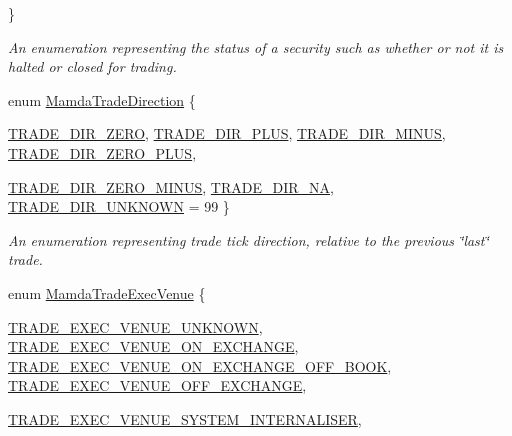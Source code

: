 \begin{CompactItemize}
 \}
\begin{CompactList}\small\item\em An enumeration representing the status of a security such as whether or not it is halted or closed for trading. \item\end{CompactList}\item 
enum \hyperlink{namespaceWombat_d2479765bb418204c8ccfd3785d2bdbe}{Mamda\-Trade\-Direction} \{ \par
\hyperlink{namespaceWombat_d2479765bb418204c8ccfd3785d2bdbe4972b420933103bdc7b20dd3f3cdd7a3}{TRADE\_\-DIR\_\-ZERO}, 
\hyperlink{namespaceWombat_d2479765bb418204c8ccfd3785d2bdbe80d6b3d5e922c65539c9a3eb99279a22}{TRADE\_\-DIR\_\-PLUS}, 
\hyperlink{namespaceWombat_d2479765bb418204c8ccfd3785d2bdbeb0517280f1434647d71e66ee732e30b5}{TRADE\_\-DIR\_\-MINUS}, 
\hyperlink{namespaceWombat_d2479765bb418204c8ccfd3785d2bdbeca1b1edf7fd88e7963866dddb80fa360}{TRADE\_\-DIR\_\-ZERO\_\-PLUS}, 
\par
\hyperlink{namespaceWombat_d2479765bb418204c8ccfd3785d2bdbead5395221de07c8d9effa09e30e1a764}{TRADE\_\-DIR\_\-ZERO\_\-MINUS}, 
\hyperlink{namespaceWombat_d2479765bb418204c8ccfd3785d2bdbe66055d9bcb7cbfc14749db0275e397dd}{TRADE\_\-DIR\_\-NA}, 
\hyperlink{namespaceWombat_d2479765bb418204c8ccfd3785d2bdbec8f053d1729f9b5b23ec8b4567dbd6ab}{TRADE\_\-DIR\_\-UNKNOWN} =  99
 \}
\begin{CompactList}\small\item\em An enumeration representing trade tick direction, relative to the previous \char`\"{}last\char`\"{} trade. \item\end{CompactList}\item 
enum \hyperlink{namespaceWombat_daf4c098665070a9e45bf835bad3548a}{Mamda\-Trade\-Exec\-Venue} \{ \par
\hyperlink{namespaceWombat_daf4c098665070a9e45bf835bad3548a37b45edd058459cba72e2a27a8683762}{TRADE\_\-EXEC\_\-VENUE\_\-UNKNOWN}, 
\hyperlink{namespaceWombat_daf4c098665070a9e45bf835bad3548aed9fc97aa9fc7c1b84a39f05deb8a5d5}{TRADE\_\-EXEC\_\-VENUE\_\-ON\_\-EXCHANGE}, 
\hyperlink{namespaceWombat_daf4c098665070a9e45bf835bad3548a31006c27488aee5ecea22a92ec3ff55e}{TRADE\_\-EXEC\_\-VENUE\_\-ON\_\-EXCHANGE\_\-OFF\_\-BOOK}, 
\hyperlink{namespaceWombat_daf4c098665070a9e45bf835bad3548ab42940d4ebb56c5f4e837ce3ddf8a1df}{TRADE\_\-EXEC\_\-VENUE\_\-OFF\_\-EXCHANGE}, 
\par
\hyperlink{namespaceWombat_daf4c098665070a9e45bf835bad3548a58385ff91e5a169a730d42071679e977}{TRADE\_\-EXEC\_\-VENUE\_\-SYSTEM\_\-INTERNALISER}, 

\end{CompactItemize}
